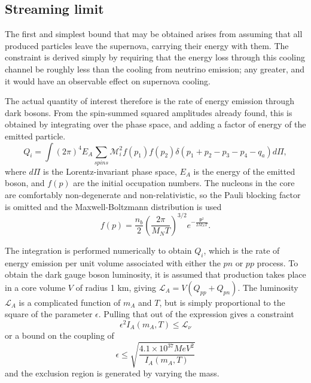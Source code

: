 \documentclass[nofootinbib,prd,superscriptaddress,twocolumn]{revtex4}
\newcommand{\beq}{\begin{equation}}
\newcommand{\eeq}{\end{equation}}
\begin{document}
\subsection{Streaming limit}
The first and simplest bound that may be obtained arises from assuming that all produced particles leave the supernova, carrying their energy with them. The constraint is derived simply by requiring that the energy loss through this cooling channel be roughly less than the cooling from neutrino emission; any greater, and it would have an observable effect on supernova cooling.

The actual quantity of interest therefore is the rate of energy emission through dark bosons. From the spin-summed squared amplitudes already found, this is obtained by integrating over the phase space, and adding a factor of energy of the emitted particle.
\beq
Q_i = \int (2\pi)^4 E_A \sum_{spins} \mathcal{M}^2_i f(p_1) f(p_2)\delta(p_1+p_2-p_3-p_4-q_a) d\Pi,
\eeq
where $d\Pi$ is the Lorentz-invariant phase space, $ E_A $ is the energy of the emitted boson, and $ f(p) $ are the initial occupation numbers. The nucleons in the core are comfortably non-degenerate and non-relativistic, so  the Pauli blocking factor is omitted and the Maxwell-Boltzmann distribution is used  
\beq
f(p) =  \frac{n_b}{2} (\frac{2 \pi}{M_N T})^{3/2} e^{-\frac{\textbf{p}^2} {2 M_N T}}.
\eeq
	
The integration is performed numerically to obtain $ Q_i$, which is the rate of energy emission per unit volume associated with either the $pn$ or $pp$ process. To obtain the dark gauge boson luminosity, it is assumed that production takes place in a core volume $V$ of radius 1 km, giving $ \mathcal{L}_A = V(Q_{pp} + Q_{pn}) $. The luminosity $\mathcal{L}_A $ is a complicated function of $ m_A $ and $ T $, but is simply proportional to the square of the parameter $ \epsilon $.  Pulling that out of the expression gives a constraint 
\beq
\epsilon^2 I_A(m_A, T) \le \mathcal{L}_\nu
\eeq
or a bound on the coupling of 
\beq 
\epsilon \le \sqrt{\frac{4.1 \times 10^{37} MeV^2}{I_A(m_A, T)}} 
\eeq 
and the exclusion region is generated by varying the mass. 
\end{document}
